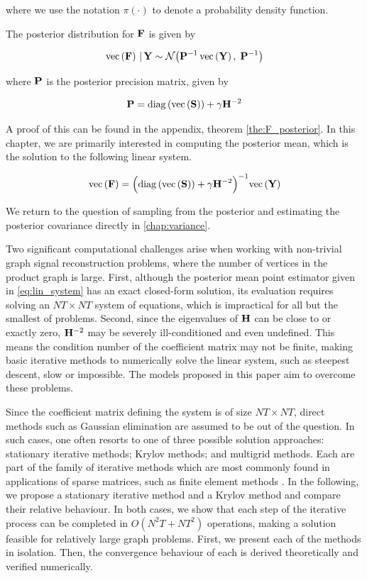 where we use the notation $\pi(\cdot)$ to denote a probability density function.

The posterior distribution for $\mathbf{F}$ is given by

\begin{equation}
    \label{eq:F_post_gsr}
    \text{\textup{vec}}\left(\mathbf{F}\right) \, | \, \mathbf{Y} \sim \mathcal{N} \big(\mathbf{P}^{-1} \, \text{\textup{vec}}\left(\mathbf{Y}\right), \; \mathbf{P}^{-1} \big)
\end{equation}

\noindent where $\mathbf{P}$ is the posterior precision matrix, given by 

\begin{equation}
    \label{eq:P_post_gsr}
    \mathbf{P} = \text{\textup{diag}}\left(\text{\textup{vec}}\left(\mathbf{S}\right)\right) + \gamma  \mathbf{H}^{-2}
\end{equation}

A proof of this can be found in the appendix, theorem \ref{the:F_posterior}. In this chapter, we are primarily interested in computing the posterior mean, which is the solution to the following linear system.

\begin{equation}
    \label{eq:lin_system}
    \text{\textup{vec}}\left(\mathbf{F}\right) = \Big(\text{\textup{diag}}\left(\text{\textup{vec}}\left(\mathbf{S}\right)\right) + \gamma  \mathbf{H}^{-2}\Big)^{-1} \text{\textup{vec}}\left(\mathbf{Y}\right)
\end{equation}

We return to the question of sampling from the posterior and estimating the posterior covariance directly in \cref{chap:variance}.

Two significant computational challenges arise when working with non-trivial graph signal reconstruction problems, where the number of vertices in the product graph is large. First, although the posterior mean point estimator given in \cref{eq:lin_system} has an exact closed-form solution, its evaluation requires solving an $NT \times NT$ system of equations, which is impractical for all but the smallest of problems. Second, since the eigenvalues of $\mathbf{H}$ can be close to or exactly zero, $\mathbf{H}^{-2}$ may be severely ill-conditioned and even undefined. This means the condition number of the coefficient matrix may not be finite, making basic iterative methods to numerically solve the linear system, such as steepest descent, slow or impossible. The models proposed in this paper aim to overcome these problems.


Since the coefficient matrix defining the system is of size $NT \times NT $, direct methods such as Gaussian elimination are assumed to be out of the question. In such cases, one often resorts to one of three possible solution approaches: stationary iterative methods; Krylov methods; and multigrid methods. Each are part of the family of iterative methods which are most commonly found in applications of sparse matrices, such as finite element methods \citep{Brenner2008}. In the following, we propose a stationary iterative method and a Krylov method and compare their relative behaviour. In both cases, we show that each step of the iterative process can be completed in $O(N^2T + NT^2)$ operations, making a solution feasible for relatively large graph problems. First, we present each of the methods in isolation. Then, the convergence behaviour of each is derived theoretically and verified numerically.


